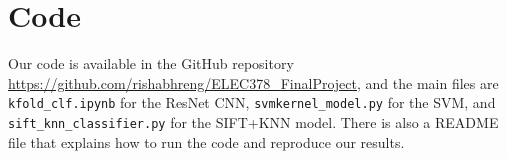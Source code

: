 \documentclass[10pt]{article} %
\begin{document}
\section{Code}
Our code is available in the GitHub repository \url{https://github.com/rishabhreng/ELEC378_FinalProject}, and the main files are \texttt{kfold\_clf.ipynb} for the ResNet CNN, \texttt{svmkernel\_model.py} for the SVM, and \newline \texttt{sift\_knn\_classifier.py} for the SIFT+KNN model. There is also a README file that explains how to run the code and reproduce our results.

\newpage


\end{document}
